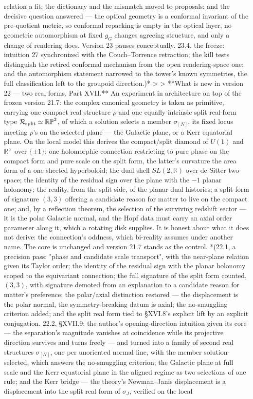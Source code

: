 relation a fit; the dictionary and the mismatch moved to proposals; and the decisive question answered — the optical geometry is a conformal invariant of the pre-quotient metric, so conformal repacking is empty in the optical layer, no geometric automorphism at fixed $g_G$ changes agreeing structure, and only a change of rendering does. Version 23 pauses conceptually. 23.4, the freeze: intuition 27 synchronized with the Couch–Torrence retraction; the kill tests distinguish the retired conformal mechanism from the open rendering-space one; and the automorphism statement narrowed to the tower's known symmetries, the full classification left to the groupoid direction.)*
>
> **What is new in version 22 — two real forms, Part XVII.** An experiment in architecture on top of the frozen version 21.7: the complex canonical geometry is taken as primitive, carrying one compact real structure $\rho$ and one equally intrinsic split real-form type $\mathcal R_{\rm split}\simeq\mathbb{RP}^2$, of which a solution selects a member $\sigma_{[N]}$, its fixed locus meeting $\rho$'s on the selected plane — the Galactic plane, or a Kerr equatorial plane. On the local model this derives the compact/split diamond of $U(1)$ and $\mathbb R^\times$ over $\{\pm1\}$; one holomorphic connection restricting to pure phase on the compact form and pure scale on the split form, the latter's curvature the area form of a one-sheeted hyperboloid; the dual shell $SL(2,\mathbb R)$ over de Sitter two-space; the identity of the residual sign over the plane with the $-1$ planar holonomy; the reality, from the split side, of the planar dual histories; a split form of signature $(3,3)$ offering a candidate reason for matter to live on the compact one; and, by a reflection theorem, the selection of the surviving redshift sector — it is the polar Galactic normal, and the Hopf data must carry an axial order parameter along it, which a rotating disk supplies. It is honest about what it does not derive: the connection's oddness, which bi-reality assumes under another name. The core is unchanged and version 21.7 stands as the control. *(22.1, a precision pass: "phase and candidate scale transport", with the near-plane relation given its Taylor order; the identity of the residual sign with the planar holonomy scoped to the equivariant connection; the full signature of the split form counted, $(3,3)$, with signature demoted from an explanation to a candidate reason for matter's preference; the polar/axial distinction restored — the displacement is the polar normal, the symmetry-breaking datum is axial; the no-smuggling criterion added; and the split real form tied to §XVI.8's explicit lift by an explicit conjugation. 22.2, §XVII.9: the author's opening-direction intuition given its core — the separation's magnitude vanishes at coincidence while its projective direction survives and turns freely — and turned into a family of second real structures $\sigma_{[N]}$, one per unoriented normal line, with the member solution-selected, which answers the no-smuggling criterion; the Galactic plane at full scale and the Kerr equatorial plane in the aligned regime as two selections of one rule; and the Kerr bridge — the theory's Newman–Janis displacement is a displacement into the split real form of $\sigma_J$, verified on the local 